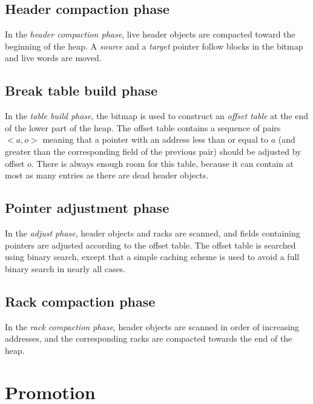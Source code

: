 \subsection{Header compaction phase}

In the \emph{header compaction phase}, live header objects are compacted
toward the beginning of the heap.  A \emph{source} and a \emph{target}
pointer follow blocks in the bitmap and live words are moved. 

\subsection{Break table build phase}
\label{sec-garbage-collection-break-table-build-phase}

In the \emph{table build phase}, the bitmap is used to construct an
\emph{offset table} at the end of the lower part of the heap.  The
offset table contains a sequence of pairs $<a,o>$ meaning that a
pointer with an address less than or equal to $a$ (and greater than
the corresponding field of the previous pair) should be adjusted by
offset $o$.  There is always enough room for this table, because it
can contain at most as many entries as there are dead header objects.  

\subsection{Pointer adjustment phase}

In the \emph{adjust phase}, header objects and racks are
scanned, and fields containing pointers are adjusted according to the
offset table.  The offset table is searched using binary search,
except that a simple caching scheme is used to avoid a full binary
search in nearly all cases. 

\subsection{Rack compaction phase}
\label{sec-garbage-collection-rack-compaction-phase}

In the \emph{rack compaction phase}, header objects are scanned in
order of increasing addresses, and the corresponding racks
are compacted towards the end of the heap.

\section{Promotion}
\label{sec-garbage-collection-promotion}


